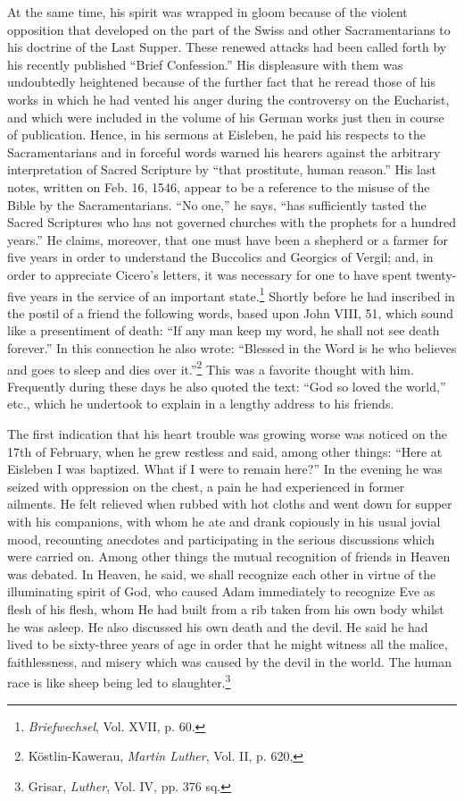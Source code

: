 At the same time, his spirit was wrapped in gloom because of the
violent opposition that developed on the part of the Swiss and other
Sacramentarians to his doctrine of the Last Supper. These renewed
attacks had been called forth by his recently published “Brief Confession.”
His displeasure with them was undoubtedly heightened because of the
further fact that he reread those of his works in which
he had vented his anger during the controversy on the Eucharist,
and which were included in the volume of his German works just then
in course of publication. Hence, in his sermons at Eisleben, he paid
his respects to the Sacramentarians and in forceful words warned
his hearers against the arbitrary interpretation of Sacred Scripture
by “that prostitute, human reason.” His last notes, written on Feb.
16, 1546, appear to be a reference to the misuse of the Bible by the
Sacramentarians. “No one,” he says, “has sufficiently tasted the Sacred
Scriptures who has not governed churches with the prophets for a
hundred years.” He claims, moreover, that one must have been a
shepherd or a farmer for five years in order to understand the Buccolics
and Georgics of Vergil; and, in order to appreciate Cicero’s letters,
it was necessary for one to have spent twenty-five years in the
service of an important state.\footnote{\textit{Briefwechsel}, Vol. XVII, p. 60.}
 Shortly before he had inscribed in the
postil of a friend the following words, based upon John VIII, 51,
which sound like a presentiment of death: “If any man keep my
word, he shall not see death forever.” In this connection he also
wrote: “Blessed in the Word is he who believes and goes to sleep and
dies over it.”\footnote{Köstlin-Kawerau, \textit{Martin Luther}, Vol. II, p. 620,}
 This was a favorite thought with him. Frequently
during these days he also quoted the text: “God so loved the world,”
etc., which he undertook to explain in a lengthy address to his friends.

The first indication that his heart trouble was growing worse was
noticed on the 17th of February, when he grew restless and said,
among other things: “Here at Eisleben I was baptized. What if I
were to remain here?” In the evening he was seized with oppression
on the chest, a pain he had experienced in former ailments. He felt
relieved when rubbed with hot cloths and went down for supper with
his companions, with whom he ate and drank copiously in his usual
jovial mood, recounting anecdotes and participating in the serious discussions
which were carried on. Among other things the mutual recognition
of friends in Heaven was debated. In Heaven, he said, we shall
recognize each other in virtue of the illuminating spirit of God, who
caused Adam immediately to recognize Eve as flesh of his flesh, whom
He had built from a rib taken from his own body whilst he was
asleep. He also discussed his own death and the devil. He said he had
lived to be sixty-three years of age in order that he might witness
all the malice, faithlessness, and misery which was caused by the devil
in the world. The human race is like sheep being led to slaughter.\footnote{Grisar, \textit{Luther}, Vol. IV, pp. 376 sq.}

